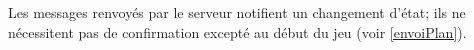 \par

Les messages renvoyés par le serveur notifient un changement d'état; ils ne nécessitent pas de confirmation excepté au début du jeu (voir \ref{envoiPlan}). \\